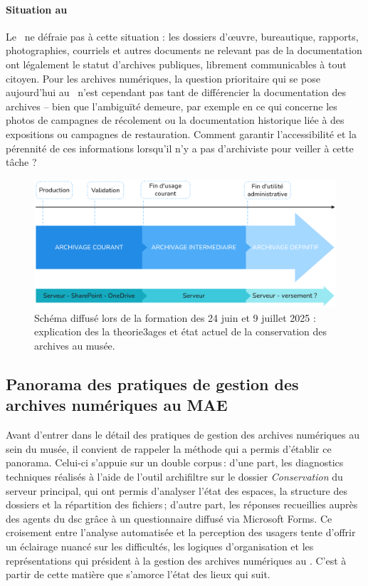\paragraph*{Situation au \mae}
Le \mae~ne défraie pas à cette situation : les dossiers d’œuvre, bureautique, rapports, photographies, courriels et autres documents ne relevant pas de la documentation ont légalement le statut d’archives publiques, librement communicables à tout citoyen. Pour les archives numériques, la question prioritaire qui se pose aujourd'hui au \mae~n'est cependant pas tant de différencier la documentation des archives -- bien que l’ambiguïté demeure, par exemple en ce qui concerne les photos de campagnes de récolement ou la documentation historique liée à des expositions ou campagnes de restauration. Comment garantir l'accessibilité et la pérennité de ces informations lorsqu'il n'y a pas d'archiviste pour veiller à cette tâche ? 

\begin{figure}
	\centering
	\includegraphics[width=0.7\linewidth]{img/SCHEM_theorie3ages}
	\caption[Cycle de vie des archives au \mae]{Schéma diffusé lors de la formation des 24 juin et 9 juillet 2025 : explication des la \gls{theorie3ages} et état actuel de la conservation des archives au musée.}
	\label{fig:schemtheorie3ages}
\end{figure}


\subsection{Panorama des pratiques de gestion des archives numériques au MAE}

Avant d’entrer dans le détail des pratiques de gestion des archives numériques au sein du musée, il convient de rappeler la méthode qui a permis d’établir ce panorama. Celui-ci s’appuie sur un double corpus : d’une part, les diagnostics techniques réalisés à l’aide de l’outil \gls{archifiltre} sur le dossier \textit{Conservation} du serveur principal, qui ont permis d’analyser l’état des espaces, la structure des dossiers et la répartition des fichiers ; d’autre part, les réponses recueillies auprès des agents du \ac{dsc} grâce à un questionnaire diffusé via Microsoft Forms. Ce croisement entre l'analyse automatisée et la perception des usagers tente d'offrir un éclairage nuancé sur les difficultés, les logiques d’organisation et les représentations qui président à la gestion des archives numériques au \mae. C’est à partir de cette matière que s’amorce l’état des lieux qui suit.

